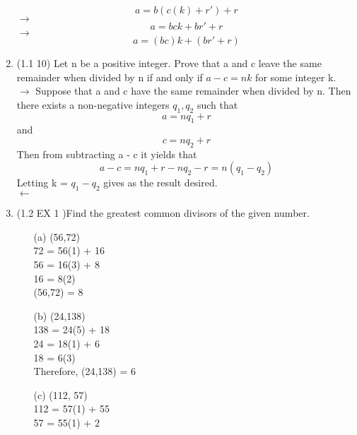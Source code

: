 \documentclass[12pt]{article}
\begin{document}
\begin{enumerate}
    \begin{equation*}
        a = b (c(k) +r') + r 
    \end{equation*}
    $\to$
    \begin{equation*}
        a = b c k + b r' + r
    \end{equation*}
    $\to $
    \begin{equation*}
        a = (bc) k + (br' + r)
    \end{equation*}
    \item (1.1 10) Let n be a positive integer. Prove that a and c leave the same remainder when divided by n if and only if $a - c = n k$ for some integer k. \\
    $\longrightarrow$
    Suppose that a and c have the same remainder when divided by n. Then there exists a non-negative integers $q_1, q_2$ such that 
    \begin{equation*}
        a = nq_1 + r
    \end{equation*}
    and 
    \begin{equation*}
        c = n q_2 + r 
    \end{equation*}
    Then from subtracting a - c it yields that 
    \begin{equation*}
        a - c = nq_1 + r - nq_2 - r = n(q_1 - q_2)
    \end{equation*}
    Letting k = $q_1 - q_2$ gives as the result desired. \\
    $\longleftarrow$ 
    \item (1.2 EX 1 )Find the greatest common divisors of the given number. 
    \begin{itemize}
        \item[(a)] (56,72) \\
        72 = 56(1) + 16 \\
        56 = 16(3) + 8 \\
        16 = 8(2) \\
        (56,72) = 8 
        \item[(b)] (24,138) \\
        138 = 24(5) + 18 \\
        24 = 18(1) + 6 \\
        18 = 6(3) \\
        Therefore, (24,138) = 6 
        \item[(c)] (112, 57) \\
        112 = 57(1) + 55 \\
        57 = 55(1) + 2 \\

\end{itemize}
\end{enumerate}
\end{document}
